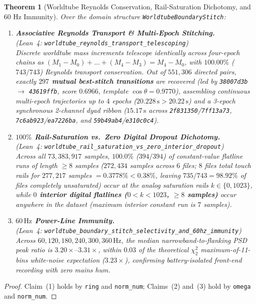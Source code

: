 \documentclass[11pt,letterpaper]{article}
\newcommand{\lean}[1]{\nolinkurl{#1}}
\newtheorem{theorem}{Theorem}[section]
\theoremstyle{definition}
\begin{document}
\begin{theorem}[Worldtube Reynolds Conservation, Rail-Saturation Dichotomy, and 60 Hz Immunity]\label{thm:pillar7}
Over the domain structure \lean{WorldtubeBoundaryStitch}:
\begin{enumerate}
  \item \textbf{Associative Reynolds Transport \& Multi-Epoch Stitching.}\\
  (\emph{Lean~4:} \lean{worldtube_reynolds_transport_telescoping})\\
  Discrete worldtube mass increments telescope identically across four-epoch chains as $(M_1 - M_0) + \dots + (M_4 - M_3) = M_4 - M_0$, with $100.00\%$ ($743/743$) Reynolds transport conservation. Out of $551{,}306$ directed pairs, exactly \textbf{$297$ mutual best-stitch transitions} are recovered (led by \texttt{38007d3b} $\to$ \texttt{43619ffb}, score $0.6966$, template $\cos\theta = 0.9770$), assembling continuous multi-epoch trajectories up to $4$ epochs ($20.228\,\text{s} > 20.22\,\text{s}$) and a 3-epoch synchronous 2-channel dyad ribbon ($15.17\,\text{s}$ across \texttt{2f831350}/\texttt{7ff13a73}, \texttt{7c6ab923}/\texttt{ea7226ba}, and \texttt{59b49ab4}/\texttt{e310c0c4}).
  \item \textbf{$100\%$ Rail-Saturation vs.\ Zero Digital Dropout Dichotomy.}\\
  (\emph{Lean~4:} \lean{worldtube_rail_saturation_vs_zero_interior_dropout})\\
  Across all $73{,}383{,}917$ samples, $100.0\%$ ($394 / 394$) of constant-value flatline runs of length $\ge 8$ samples ($272{,}434$ samples across $6$ files; $8$ files total touch rails for $277{,}217$ samples $= 0.3778\% < 0.38\%$, leaving $735 / 743 = 98.92\%$ of files completely unsaturated) occur at the analog saturation rails $k \in \{0, 1023\}$, while \textbf{$0$ interior digital flatlines ($0 < k < 1023$, $\ge 8$ samples)} occur anywhere in the dataset (maximum interior constant run is $7$ samples).
  \item \textbf{$60\,\text{Hz}$ Power-Line Immunity.}\\
  (\emph{Lean~4:} \lean{worldtube_boundary_stitch_selectivity_and_60hz_immunity})\\
  Across $60, 120, 180, 240, 300, 360\,\text{Hz}$, the median narrowband-to-flanking PSD peak ratio is $3.20\times\text{--}3.31\times$, within $0.03$ of the theoretical $\chi^2_2$ maximum-of-11-bins white-noise expectation ($3.23\times$), confirming battery-isolated front-end recording with zero mains hum.
\end{enumerate}
\end{theorem}
\begin{proof}
Claim~(1) holds by \texttt{ring} and \texttt{norm\_num}; Claims~(2) and~(3) hold by \texttt{omega} and \texttt{norm\_num}.
\end{proof}
\end{document}

